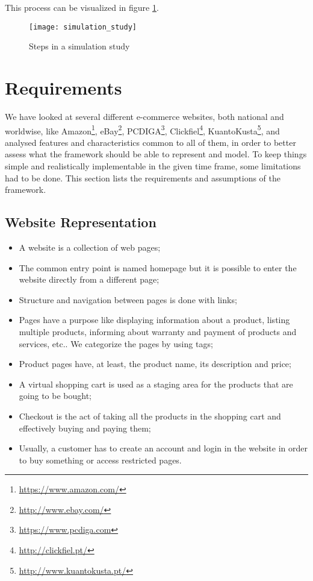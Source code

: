 This process can be visualized in figure \ref{fig:sim}.

\begin{figure}[p]
    \begin{center}
        \leavevmode
        \texttt{[image: simulation\_study]}
        \caption{Steps in a simulation study \cite{Banks2004}}
        \label{fig:sim}
    \end{center}
\end{figure}

\section{Requirements}

We have looked at several different e-commerce websites, both national and 
worldwise, like Amazon\footnote{\url{https://www.amazon.com/}}, 
eBay\footnote{\url{http://www.ebay.com/}}, 
PCDIGA\footnote{\url{https://www.pcdiga.com}}, 
Clickfiel\footnote{\url{http://clickfiel.pt/}}, 
KuantoKusta\footnote{\url{http://www.kuantokusta.pt/}}, and analysed features 
and characteristics common to all of them, in order to better assess what the 
framework should be able to represent and model. To keep things simple and 
realistically implementable in the given time frame, some limitations had to be 
done. This section lists the requirements and assumptions of the framework.

\subsection{Website Representation}

\begin{itemize}
    \item A website is a collection of web pages;
    \item The common entry point is named homepage but it is possible to enter 
    the website directly from a different page;
    \item Structure and navigation between pages is done with links;
    \item Pages have a purpose like displaying information about a 
    product, listing multiple products, informing about warranty and payment of 
    products and services, etc.. We categorize the pages by using tags;
    \item Product pages have, at least, the product name, its description and 
    price;
    \item A virtual shopping cart is used as a staging area for the products 
    that are going to be bought;
    \item Checkout is the act of taking all the products in the shopping cart 
    and effectively buying and paying them;
    \item Usually, a customer has to create an account and login in the website 
    in order to buy something or access restricted pages.
\end{itemize}

